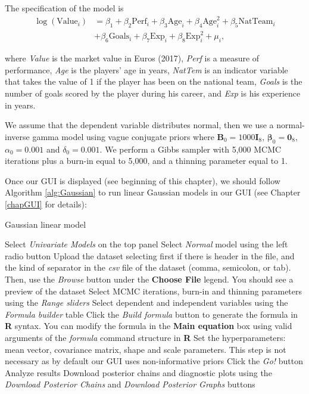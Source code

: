 The specification of the model is
\begin{align*}
	\log(\text{Value}_i)&={\beta}_1+{\beta}_2\text{Perf}_i+{\beta}_3\text{Age}_i+{\beta}_4\text{Age}^2_i+{\beta}_5\text{NatTeam}_i\\
	&+{\beta}_6\text{Goals}_i+{\beta}_7\text{Exp}_i+{\beta}_{8}\text{Exp}^2_i+\mu_i,
\end{align*}

where \textit{Value} is the market value in Euros (2017), \textit{Perf} is a measure of performance, \textit{Age} is the players' age in years, \textit{NatTem} is an indicator variable that takes the value of 1 if the player has been on the national team, \textit{Goals} is the number of goals scored by the player during his career, and \textit{Exp} is his experience in years.  

We assume that the dependent variable distributes normal, then we use a normal-inverse gamma model using vague conjugate priors where ${\bm{B}}_0=1000{\bm{I}}_{8}$, $\bm{\beta}_0={\bm{0}}_{8}$, $\alpha_0=0.001$ and $\delta_0=0.001$. We perform a Gibbs sampler with 5,000 MCMC iterations plus a burn-in equal to 5,000, and a thinning parameter equal to 1.

Once our GUI is displayed (see beginning of this chapter), we should follow Algorithm \ref{alg:Gaussian} to run linear Gaussian models in our GUI (see Chapter \ref{chapGUI} for details):
\begin{algorithm}[h!]
	\caption{Gaussian linear model}\label{alg:Gaussian}
	\begin{algorithmic}[1]  		 			
		\State Select \textit{Univariate Models} on the top panel
		\State Select \textit{Normal} model using the left radio button
		\State Upload the dataset selecting first if there is header in the file, and the kind of separator in the \textit{csv} file of the dataset (comma, semicolon, or tab). Then, use the \textit{Browse} button under the \textbf{Choose File} legend. You should see a preview of the dataset
		\State Select MCMC iterations, burn-in and thinning parameters using the \textit{Range sliders}
		\State Select dependent and independent variables using the \textit{Formula builder} table
		\State Click the \textit{Build formula} button to generate the formula in \textbf{R} syntax. You can modify the formula in the \textbf{Main equation} box using valid arguments of the \textit{formula} command structure in \textbf{R}
		\State Set the hyperparameters: mean vector, covariance matrix, shape and scale parameters. This step is not necessary as by default our GUI uses non-informative priors
		\State Click the \textit{Go!} button
		\State Analyze results
		\State Download posterior chains and diagnostic plots using the \textit{Download Posterior Chains} and \textit{Download Posterior Graphs} buttons
	\end{algorithmic} 
\end{algorithm}

